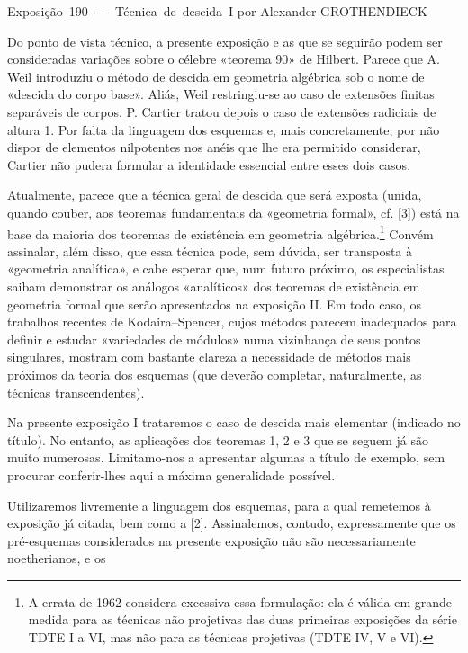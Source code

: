 \unit{Exposição 190 -- Técnica de descida I}
%
  {por Alexander GROTHENDIECK}

Do ponto de vista técnico, a presente exposição e as que se seguirão podem
ser consideradas variações sobre o célebre «teorema 90» de Hilbert.
Parece que A. Weil introduziu o método de descida em geometria algébrica sob
o nome de «descida do corpo base». Aliás, Weil restringiu-se ao caso de
extensões finitas separáveis de corpos. P. Cartier tratou depois o caso de
extensões radiciais de altura 1. Por falta da linguagem dos esquemas e,
mais concretamente, por não dispor de elementos nilpotentes nos anéis que
lhe era permitido considerar, Cartier não pudera formular a identidade
essencial entre esses dois casos.

Atualmente, parece que a técnica geral de descida que será exposta (unida,
quando couber, aos teoremas fundamentais da «geometria formal», cf. [3])
está na base da maioria dos teoremas de existência em geometria
algébrica.\footnote{A errata de 1962 considera excessiva essa formulação: ela é
válida em grande medida para as técnicas não projetivas das duas primeiras
exposições da série TDTE I a VI, mas não para as técnicas projetivas (TDTE IV,
V e VI).} Convém assinalar, além disso, que essa técnica pode, sem dúvida, ser
transposta à «geometria analítica», e cabe esperar que, num futuro próximo,
os especialistas saibam demonstrar os análogos «analíticos» dos teoremas de
existência em geometria formal que serão apresentados na exposição II. Em
todo caso, os trabalhos recentes de Kodaira--Spencer, cujos métodos parecem
inadequados para definir e estudar «variedades de módulos» numa vizinhança
de seus pontos singulares, mostram com bastante clareza a necessidade de
métodos mais próximos da teoria dos esquemas (que deverão completar,
naturalmente, as técnicas transcendentes).

Na presente exposição I trataremos o caso de descida mais elementar (indicado
no título). No entanto, as aplicações dos teoremas 1, 2 e 3 que se seguem já
são muito numerosas. Limitamo-nos a apresentar algumas a título de exemplo,
sem procurar conferir-lhes aqui a máxima generalidade possível.

Utilizaremos livremente a linguagem dos esquemas, para a qual remetemos à
exposição já citada, bem como a [2]. Assinalemos, contudo, expressamente que os
pré-esquemas considerados na presente exposição não são necessariamente
noetherianos, e os


